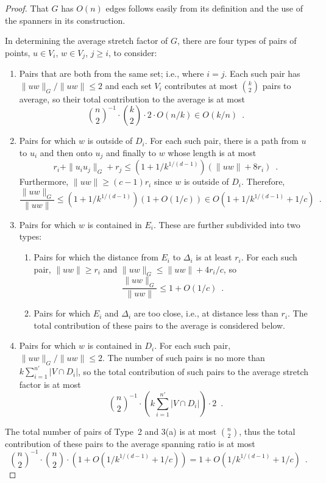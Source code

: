 \documentclass{patmorin}
\begin{document}
\begin{proof}
  That $G$ has $O(n)$ edges follows easily from its definition and the
  use of the spanners in its construction.

  In determining the average stretch factor of $G$, there are four types
  of pairs of points, $u\in V_i$, $w\in V_j$, $j\ge i$, to consider:
  \begin{enumerate}
    \item Pairs that are both from the same set; i.e., where $i=j$.  Each such
      pair has $\|uw\|_G/\|uw\|\le 2$ and each set $V_i$ contributes at
      most $\binom{k}{2}$ pairs to average, so their total contribution
      to the average is at most
      \[
        \binom{n}{2}^{-1}\cdot\binom{k}{2}\cdot 2 \cdot O(n/k) \in O(k/n)
        \enspace .
      \]
    \item Pairs for which $w$ is outside of $D_i$.  For each
      such pair,  there is a path from $u$ to $u_i$ and then onto $u_j$
      and finally to $w$ whose length is at most
      \[
         r_i + \|u_iu_j\|_G + r_j
         \le (1+1/k^{1/(d-1)})(\|uw\| + 8r_i) \enspace .
      \]
      Furthermore, $\|uw\|\ge (c-1)r_i$ since $w$ is outside of $D_i$.
      Therefore,
      \[
        \frac{\|uw\|_G}{\|uw\|}\le (1+1/k^{1/(d-1)})(1+O(1/c)) 
           \in O(1+1/k^{1/(d-1)}+1/c) \enspace .
      \]
    \item Pairs for which $w$ is contained in $E_i$. These are further
      subdivided into two types:
      \begin{enumerate}
        \item Pairs for which the distance from $E_i$ to $\Delta_i$
          is at least $r_i$.  For each such pair, $\|uw\| \ge r_i$
          and $\|uw\|_G\le \|uw\|+4r_i/c$, so
          \[
            \frac{\|uw\|_G}{\|uw\|}\le 1+O(1/c) \enspace .
          \]
         \item Pairs for which $E_i$ and $\Delta_i$ are too close, i.e.,
           at distance less than $r_i$.  The total contribution of these
           pairs to the average is considered below.
      \end{enumerate}  
    \item Pairs for which $w$ is contained in $D_i$.  For each
      such pair, $\|uw\|_G/\|uw\|\le 2$.  The number of such pairs is no
      more than $k\sum_{i=1}^{n'}|V\cap D_i|$, so the total contribution
      of such pairs to the average stretch factor is at most
      \[
        \binom{n}{2}^{-1}
          \cdot\left(k\sum_{i=1}^{n'} |V\cap D_i|\right)\cdot 2 \enspace .
      \]
  \end{enumerate}
  The total number of pairs of Type~2 and 3(a) is at most $\binom{n}{2}$,
  thus the total contribution of these pairs to the average spanning
  ratio is at most
  \[
    \binom{n}{2}^{-1}\cdot\binom{n}{2}\cdot(1+O(1/k^{1/(d-1)}+1/c)) = 1+O(1/k^{1/(d-1)}+1/c) \enspace .
  \]
 

\end{proof}
\end{document}
